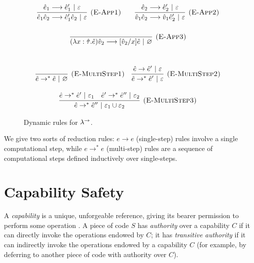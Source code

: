 \begin{figure}[h]

\noindent
{}

\[
\begin{array}{c}

\infer[\textsc{(E-App1)}]
	{\hat e_1 \hat e_2 \longrightarrow \hat e_1' \hat e_2~|~\varepsilon}
	{\hat e_1 \longrightarrow \hat e_1'~|~\varepsilon}
	~~~~~~
\infer[\textsc{(E-App2)}]
	{\hat v_1 \hat e_2 \longrightarrow \hat v_1 \hat e_2'~|~\varepsilon} 
	{\hat e_2 \longrightarrow \hat e_2'~|~\varepsilon}\\[4ex]
	
\infer[\textsc{(E-App3)}]
	{ (\lambda x: \hat \tau.\hat e) \hat v_2 \longrightarrow [\hat v_2/x]\hat e~|~\varnothing }
	{}\\[4ex]
	
\end{array}
\]

\noindent
{}

\[
\begin{array}{c}

\infer[\textsc{(E-MultiStep1)}]
	{\hat e \rightarrow^{*} \hat e~|~\varnothing}
	{}
~~~
\infer[\textsc{(E-MultiStep2)}]
	{\hat e \rightarrow^{*} \hat e'~|~\varepsilon}
	{\hat e \rightarrow \hat e'~|~\varepsilon} \\[3ex]
	
\infer[\textsc{(E-MultiStep3)}]
	{\hat e \rightarrow^{*} \hat e''~|~\varepsilon_1 \cup \varepsilon_2}
	{\hat e \rightarrow^{*} \hat e'~|~\varepsilon_1 & \hat e' \rightarrow^{*} \hat e''~|~\varepsilon_2}
\end{array}
\]
\vspace{-7pt}
\caption{Dynamic rules for $\lambda^{\rightarrow}$.}
\label{This is the label.}
\end{figure}

We give two sorts of reduction rules: $e \longrightarrow e$ (single-step) rules involve a single computational step, while $e \longrightarrow^{*} e$ (multi-step) rules are a sequence of computational steps defined inductively over single-steps. 

\section{Capability Safety}

A \textit{capability} is a unique, unforgeable reference, giving its bearer permission to perform some operation \cite{dennis66}. A piece of code $S$ has \textit{authority} over a capability $C$ if it can directly invoke the operations endowed by $C$; it has \textit{transitive authority} if it can indirectly invoke the operations endowed by a capability $C$ (for example, by deferring to another piece of code with authority over $C$).

